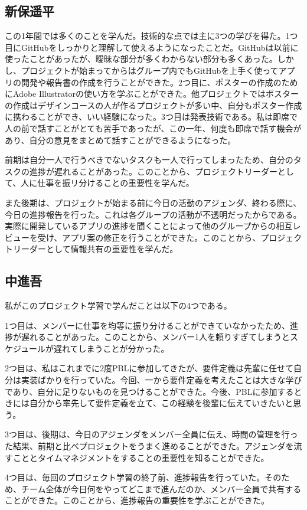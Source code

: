 \documentclass[openany,11pt,papersize]{jsbook}
\begin{document}

\subsection{新保遥平}

\par この1年間では多くのことを学んだ。技術的な点では主に3つの学びを得た。1つ目にGitHubをしっかりと理解して使えるようになったことだ。GitHubは以前に使ったことがあったが、曖昧な部分が多くわからない部分も多くあった。しかし、プロジェクトが始まってからはグループ内でもGitHubを上手く使ってアプリの開発や報告書の作成を行うことができた。2つ目に、ポスターの作成のためにAdobe Illustratorの使い方を学ぶことができた。他プロジェクトではポスターの作成はデザインコースの人が作るプロジェクトが多い中、自分もポスター作成に携わることができ、いい経験になった。3つ目は発表技術である。私は即席で人の前で話すことがとても苦手であったが、この一年、何度も即席で話す機会があり、自分の意見をまとめて話すことができるようになった。

\par 前期は自分一人で行うべきでないタスクも一人で行ってしまったため、自分のタスクの進捗が遅れることがあった。このことから、プロジェクトリーダーとして、人に仕事を振リ分けることの重要性を学んだ。

\par また後期は、プロジェクトが始まる前に今日の活動のアジェンダ、終わる際に、今日の進捗報告を行った。これは各グループの活動が不透明だったからである。実際に開発しているアプリの進捗を聞くことによって他のグループからの相互レビューを受け、アプリ案の修正を行うことができた。このことから、プロジェクトリーダーとして情報共有の重要性を学んだ。


\subsection{中進吾}
\par 私がこのプロジェクト学習で学んだことは以下の4つである。
\par 1つ目は、メンバーに仕事を均等に振り分けることができていなかったため、進捗が遅れることがあった。このことから、メンバー1人を頼りすぎてしまうとスケジュールが遅れてしまうことが分かった。
\par 2つ目は、私はこれまでに2度PBLに参加してきたが、要件定義は先輩に任せて自分は実装ばかりを行っていた。今回、一から要件定義を考えたことは大きな学びであり、自分に足りないものを見つけることができた。今後、PBLに参加するときには自分から率先して要件定義を立て、この経験を後輩に伝えていきたいと思う。
\par 3つ目は、後期は、今日のアジェンダをメンバー全員に伝え、時間の管理を行った結果、前期と比べプロジェクトをうまく進めることができた。アジェンダを流すこととタイムマネジメントをすることの重要性を知ることができた。
\par 4つ目は、毎回のプロジェクト学習の終了前、進捗報告を行っていた。そのため、チーム全体が今日何をやってどこまで進んだのか、メンバー全員で共有することができた。このことから、進捗報告の重要性を学ぶことができた。
\end{document}
